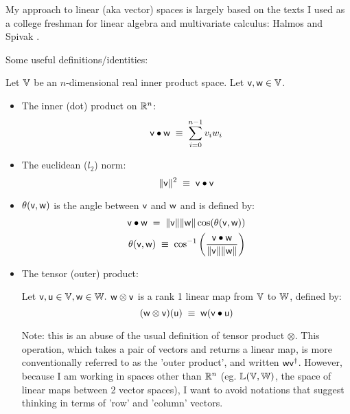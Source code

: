 \label{sec:Linear-spaces}

My approach to linear (aka vector) spaces is largely based on
the texts I used as a college freshman for linear algebra and
multivariate calculus: Halmos \cite{halmos-1958}
and Spivak \cite{spivak-1965}.

Some useful definitions/identities:

Let ${\mathbb{V}}$ be an $n$-dimensional real inner product space.
Let $\mathsf{v}, \mathsf{w} \in \mathbb{V}$.


\begin{itemize}
\item The inner (dot) product on $\mathbb{R}^n$:
\begin{equation}
\mathsf{v} \bullet \mathsf{w} \; \equiv \; \sum_{i=0}^{n-1} v_i w_i
\end{equation}

\item The euclidean ($l_2$) norm:
\begin{equation}
\| \mathsf{v} \|^2 \; \equiv \; \mathsf{v} \bullet \mathsf{v}
\end{equation}

\item $\theta(\mathsf{v},\mathsf{w})$ is the angle between $\mathsf{v}$ and $\mathsf{w}$
and is defined by:
\begin{eqnarray}
\mathsf{v} \bullet \mathsf{w} \; = \; \| \mathsf{v} \| \| \mathsf{w} \| \cos(\theta(\mathsf{v},\mathsf{w}))
\\
\theta(\mathsf{v},\mathsf{w})
\; \equiv \;
\cos^{-1} \left(\frac{ \mathsf{v} \bullet \mathsf{w} }{\| \mathsf{v} \| \| \mathsf{w} \| } \right)
\nonumber
\end{eqnarray}

\item The tensor (outer) product:

Let $\mathsf{v}, \mathsf{u} \in \mathbb{V}, \mathsf{w} \in \mathbb{W}.$
$\mathsf{w} \otimes \mathsf{v}$ is a rank 1 linear map
from $\mathbb{V}$ to $\mathbb{W}$, defined by:
\begin{equation}
(\mathsf{w} \otimes \mathsf{v})(\mathsf{u}) \; \equiv \; \mathsf{w} (\mathsf{v} \bullet \mathsf{u})
\end{equation}

Note: this is an abuse of the usual definition of tensor product $\otimes$.
This operation, which takes a pair of vectors and returns a linear map,
is more conventionally referred to as the 'outer product',
and written $\mathsf{w} \mathsf{v}^{\dagger}$.
However, because I am working in spaces other than $\mathbb{R}^n$
(eg. $\mathbb{L}(\mathbb{V},\mathbb{W})$, the space of linear maps
between 2 vector spaces),
I want to avoid notations that suggest thinking in terms
of 'row' and 'column' vectors.


\end{itemize}
